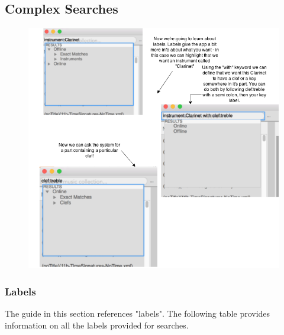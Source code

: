 \subsection{Complex Searches}
\begin{figure}[H]
\centering
\includegraphics[width=500pt]{complex-searching}
\end{figure}
\subsubsection{Labels}
The guide in this section references "labels". The following table provides information on all the labels provided for searches.

